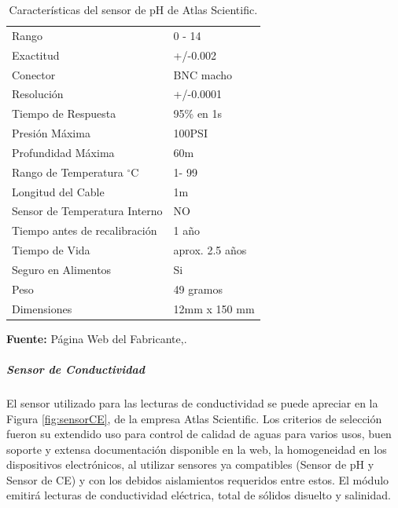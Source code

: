 \begin{table}[H]
\protect\caption[Características del sensor de pH de Atlas Scientific]{Características del sensor de pH de Atlas Scientific.}
\label{tab: caract_sondaph}
\begin{center}
\begin{tabular}{l l}
\hline
Rango    &  0 - 14\\
Exactitud      &  +/-0.002\\
Conector &  BNC macho\\
Resolución   &  +/-0.0001\\
Tiempo de Respuesta   &  95\% en 1s\\
Presión Máxima    &  100PSI\\
Profundidad Máxima	& 60m\\
Rango de Temperatura $^{\circ}$C	& 1- 99\\
Longitud del Cable	& 1m\\
Sensor de Temperatura Interno	& NO\\
Tiempo antes de recalibraci\'on	& 1 año\\
Tiempo de Vida	& aprox. 2.5 años\\
Seguro en Alimentos & Si\\
Peso & 49 gramos\\
Dimensiones & 12mm x 150 mm\\
\hline
\end{tabular}
\vspace{5mm}
\newline
\hfill
\textbf{Fuente: }P\'agina Web del Fabricante,\cite{atlasph}. 
\end{center}
\end{table} 

\subparagraph{Sensor de Conductividad}
El sensor utilizado para las lecturas de conductividad se puede apreciar en la Figura \ref{fig:sensorCE}, de la empresa Atlas Scientific. Los criterios de selecci\'on fueron su extendido uso para control de calidad de aguas para varios usos, buen soporte y extensa documentaci\'on disponible en la web, la homogeneidad en los dispositivos electr\'onicos, al utilizar sensores ya compatibles (Sensor de pH y Sensor de CE) y con los debidos aislamientos requeridos entre estos. El m\'odulo emitir\'a lecturas de conductividad el\'ectrica, total de s\'olidos disuelto y salinidad.

